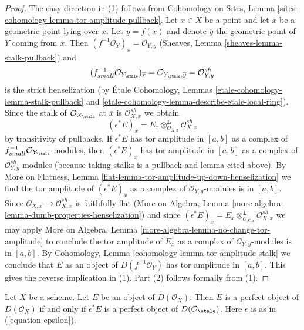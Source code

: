 \begin{proof}
The easy direction in (1) follows from Cohomology on Sites, Lemma
\ref{sites-cohomology-lemma-tor-amplitude-pullback}.
Let $x \in X$ be a point and let $\overline{x}$ be a geometric
point lying over $x$. Let $y = f(x)$ and denote $\overline{y}$
the geometric point of $Y$ coming from $\overline{x}$.
Then $(f^{-1}\mathcal{O}_Y)_x = \mathcal{O}_{Y, y}$
(Sheaves, Lemma \ref{sheaves-lemma-stalk-pullback})
and
$$
(f_{small}^{-1}\mathcal{O}_{Y_\etale})_{\overline{x}} =
\mathcal{O}_{Y_\etale, \overline{y}} =
\mathcal{O}_{Y, y}^{sh}
$$
is the strict henselization
(by \'Etale Cohomology, Lemmas \ref{etale-cohomology-lemma-stalk-pullback}
and \ref{etale-cohomology-lemma-describe-etale-local-ring}).
Since the stalk of $\mathcal{O}_{X_\etale}$ at $\overline{x}$ is
$\mathcal{O}_{X, x}^{sh}$ we obtain
$$
(\epsilon^*E)_{\overline{x}} =
E_x \otimes_{\mathcal{O}_{X, x}}^\mathbf{L} \mathcal{O}_{X, x}^{sh}
$$
by transitivity of pullbacks. If $\epsilon^*E$ has tor amplitude
in $[a, b]$ as a complex of $f_{small}^{-1}\mathcal{O}_{Y_\etale}$-modules,
then $(\epsilon^*E)_{\overline{x}}$ has tor amplitude in $[a, b]$
as a complex of $\mathcal{O}_{Y, y}^{sh}$-modules
(because taking stalks is a pullback and lemma cited above). By
More on Flatness, Lemma \ref{flat-lemma-tor-amplitude-up-down-henselization}
we find the tor amplitude of
$(\epsilon^*E)_{\overline{x}}$
as a complex of $\mathcal{O}_{Y, y}$-modules is in $[a, b]$.
Since $\mathcal{O}_{X, x} \to \mathcal{O}_{X, x}^{sh}$ is faithfully
flat (More on Algebra, Lemma
\ref{more-algebra-lemma-dumb-properties-henselization}) and since
$(\epsilon^*E)_{\overline{x}} =
E_x \otimes_{\mathcal{O}_{X, x}}^\mathbf{L} \mathcal{O}_{X, x}^{sh}$
we may apply
More on Algebra, Lemma \ref{more-algebra-lemma-no-change-tor-amplitude}
to conclude the tor amplitude of $E_x$ as a complex of
$\mathcal{O}_{Y, y}$-modules is in $[a, b]$.
By Cohomology, Lemma \ref{cohomology-lemma-tor-amplitude-stalk}
we conclude that $E$ as an object of $D(f^{-1}\mathcal{O}_Y)$
has tor amplitude in $[a, b]$. This gives the reverse implication in (1).
Part (2) follows formally from (1).
\end{proof}

\begin{lemma}
\label{lemma-descend-perfect}
Let $X$ be a scheme. Let $E$ be an object of $D(\mathcal{O}_X)$.
Then $E$ is a perfect object of $D(\mathcal{O}_X)$ if and only if
$\epsilon^*E$ is a perfect object of $D(\mathcal{O}_\etale)$.
Here $\epsilon$ is as in (\ref{equation-epsilon}).
\end{lemma}


